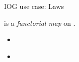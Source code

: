 \documentclass[aspectratio=169]{beamer}
\begin{document}
\begin{frame}[fragile]{IOG use case: Laws}

 is a \textit{functorial map} on .
\begin{itemize}
\item \begin{code}[inline]%
\>[0]%
\>[10]\AgdaSymbol{:}\AgdaSpace{}%
\AgdaSymbol{(}\AgdaSpace{}%
\AgdaSymbol{:}\AgdaSpace{}%
\AgdaSpace{}%
\AgdaSymbol{)}\AgdaSpace{}%
\AgdaSpace{}%
\AgdaSpace{}%
\AgdaSpace{}%
\AgdaSpace{}%
\AgdaSpace{}%
\<%
\end{code}
\item \begin{code}[inline]%
\>[0]%
\>[10]\AgdaSymbol{:}\AgdaSpace{}%
\AgdaSymbol{(}\AgdaSpace{}%
\AgdaSymbol{:}\AgdaSpace{}%
\AgdaSpace{}%
\AgdaSymbol{)}\AgdaSpace{}%
\AgdaSymbol{(}\AgdaSpace{}%
\AgdaSymbol{:}\AgdaSpace{}%
\AgdaSpace{}%
\AgdaSpace{}%
%
\>[39]\AgdaSymbol{)}\AgdaSpace{}%
\AgdaSymbol{(}\AgdaSpace{}%
\AgdaSymbol{:}\AgdaSpace{}%
\AgdaSpace{}%
\AgdaSpace{}%
\AgdaSpace{}%
\AgdaSymbol{)}\<%
\\
%
\>[10]\AgdaSpace{}%
\AgdaSpace{}%
\AgdaSymbol{(}\AgdaSpace{}%
\AgdaSpace{}%
\AgdaSymbol{)}\AgdaSpace{}%
\AgdaSpace{}%
\AgdaSpace{}%
\AgdaSpace{}%
\AgdaSpace{}%
\AgdaSymbol{(}\AgdaSpace{}%
\AgdaSpace{}%
\AgdaSymbol{)}\<%
\end{code}
\end{itemize}

\pause


\end{frame}
\end{document}
